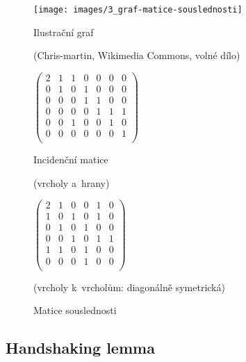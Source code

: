 \begin{figure}[ht!]
    \centering
    \begin{minipage}{0.25\textwidth}
        \centering
        \texttt{[image: images/3\_graf-matice-souslednosti]}
        \caption[Ilustrační graf]{Ilustrační graf}
        \label{ilustracni-graf-matice}
        {\tiny (Chris-martin, Wikimedia Commons, volné dílo)}
    \end{minipage}%
    \begin{minipage}{0.35\textwidth}
        \centering
        $\left( \begin{matrix}
                    2 & 1 & 1 & 0 & 0 & 0 & 0 \\
                    0 & 1 & 0 & 1 & 0 & 0 & 0 \\
                    0 & 0 & 0 & 1 & 1 & 0 & 0 \\
                    0 & 0 & 0 & 0 & 1 & 1 & 1 \\
                    0 & 0 & 1 & 0 & 0 & 1 & 0 \\
                    0 & 0 & 0 & 0 & 0 & 0 & 1 \\
                \end{matrix} \right)$
        \caption[Incidenční matice]{Incidenční matice}
        (vrcholy a~hrany)
    \end{minipage}%
    \begin{minipage}{0.3\textwidth}
        \centering
        $\left( \begin{matrix}
                    2 & 1 & 0 & 0 & 1 & 0 \\
                    1 & 0 & 1 & 0 & 1 & 0 \\
                    0 & 1 & 0 & 1 & 0 & 0 \\
                    0 & 0 & 1 & 0 & 1 & 1 \\
                    1 & 1 & 0 & 1 & 0 & 0 \\
                    0 & 0 & 0 & 1 & 0 & 0 \\
                \end{matrix} \right)$
        \caption[Matice souslednosti]{Matice souslednosti}
        (vrcholy k~vrcholům: diagonálně symetrická)
    \end{minipage}
\end{figure}
\FloatBarrier

\subsection{Handshaking lemma}


